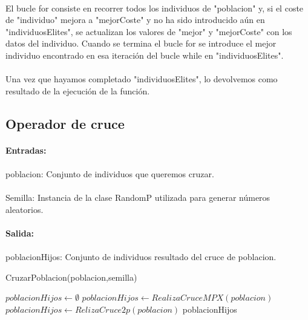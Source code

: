 	\paragraph{}El bucle for consiste en recorrer todos los individuos de "poblacion" y, si el coste de "individuo" mejora a "mejorCoste" y no ha sido introducido aún en "individuosElites", se actualizan los valores de "mejor" y "mejorCoste" con los datos del individuo. Cuando se termina el bucle for se introduce el mejor individuo encontrado en esa iteración del bucle while en "individuosElites".
	
	\paragraph{}Una vez que hayamos completado "individuosElites", lo devolvemos como resultado de la ejecución de la función.
	
	\newpage
	
	\subsection{Operador de cruce}
	
	\paragraph{Entradas:}
	
	\paragraph{}poblacion: Conjunto de individuos que queremos cruzar.
	
	\paragraph{}Semilla: Instancia de la clase RandomP utilizada para generar números aleatorios.
	
	\paragraph{Salida:}
	
	\paragraph{}poblacionHijos: Conjunto de individuos resultado del cruce de poblacion.

	\begin{algorithm}[H]
		\caption{CruzarPoblacion(poblacion,semilla)}
		\begin{algorithmic}
			\STATE $poblacionHijos \leftarrow \emptyset$
			\STATE $poblacionHijos \leftarrow RealizaCruceMPX(poblacion)$
			\ELSE
			\STATE $poblacionHijos \leftarrow RelizaCruce2p(poblacion)$
			\ENDIF
			\RETURN poblacionHijos
		\end{algorithmic}
	\end{algorithm}

